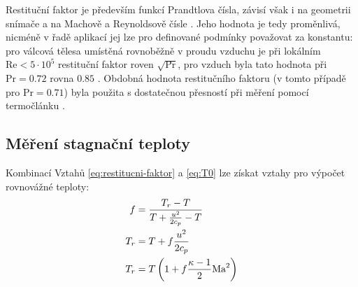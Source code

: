     Restituční faktor je především funkcí Prandtlova čísla, závisí však i na geometrii snímače a na Machově a Reynoldsově čísle \cite{Leontiev2017a}. Jeho hodnota je tedy proměnlivá, nicméně v řadě aplikací jej lze pro definované podmínky považovat za konstantu: pro válcová tělesa umístěná rovnoběžně v proudu vzduchu je při lokálním $\textrm{Re} < 5 \cdot 10^5$ restituční faktor roven $\sqrt{\textrm{Pr}}$, pro vzduch byla tato hodnota při $\textrm{Pr} = 0.72$ rovna $0.85$ \cite{Shapiro1954}. Obdobná hodnota restitučního faktoru (v tomto případě pro $\textrm{Pr}=0.71$) byla použita s dostatečnou přesností při měření pomocí \linebreak termočlánku \cite{Ishibashi2012}.

    \subsection{Měření stagnační teploty}

    Kombinací Vztahů \ref{eq:restitucni-faktor} a \ref{eq:T0} lze získat vztahy pro výpočet rovnovážné teploty:
    \begin{align}
        f &= \frac{T_r - T}{T + \frac{u^2}{2 c_p} - T} \\
        T_r &= T + f \frac{u^2}{2 c_p} \\
        T_r &= T \left( 1 + f \frac{\kappa - 1}{2} \textrm{Ma} ^2 \right)
    \end{align}